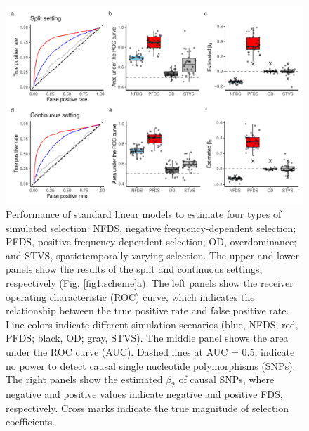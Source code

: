 \documentclass[12pt,]{article}
\begin{document}
\begin{figure}[]
  \includegraphics[width=\linewidth]{beta2LMdomi.pdf}
  \caption{Performance of standard linear models to estimate four types of simulated selection: NFDS, negative frequency-dependent selection; PFDS, positive frequency-dependent selection; OD, overdominance; and STVS, spatiotemporally varying selection. The upper and lower panels show the results of the split and continuous settings, respectively (Fig. \ref{fig1:scheme}a). The left panels show the receiver operating characteristic (ROC) curve, which indicates the relationship between the true positive rate and false positive rate. Line colors indicate different simulation scenarios (blue, NFDS; red, PFDS; black, OD; gray, STVS). The middle panel shows the area under the ROC curve (AUC). Dashed lines at AUC = 0.5, indicate no power to detect causal single nucleotide polymorphisms (SNPs). The right panels show the estimated $\beta_2$ of causal SNPs, where negative and positive values indicate negative and positive FDS, respectively. Cross marks indicate the true magnitude of selection coefficients.}
  \label{figS5:beta2LM}
\end{figure}
\end{document}
